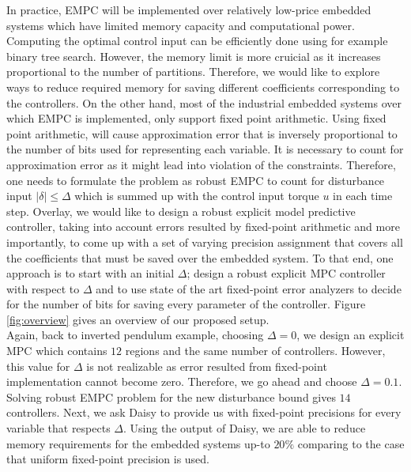 	In practice, EMPC will be implemented over relatively low-price embedded systems which have limited memory capacity and computational power. Computing the optimal control input can be efficiently done using for example binary tree search. However, the memory limit is more cruicial as it increases proportional to the number of partitions.	Therefore, we would like to explore ways to reduce required memory for saving different coefficients corresponding to the controllers.
	On the other hand, most of the industrial embedded systems over which EMPC is implemented, only support fixed point arithmetic. Using fixed point arithmetic, will cause approximation error that is inversely proportional to the number of bits used for representing each variable. It is necessary to count for approximation error as it might lead into violation of the constraints. Therefore, one needs to formulate the problem as robust EMPC to count for disturbance input $|\delta|\leq \Delta$ which is summed up with the control input torque $u$ in each time step. %
	Overlay, we would like to design a robust explicit model predictive controller, taking into account errors resulted by fixed-point arithmetic and more importantly, to come up with a set of varying precision assignment that covers all the coefficients that must be saved over the embedded system. To that end, one approach is to start with an initial $\Delta$; design a robust explicit MPC controller with respect to $\Delta$ and to use state of the art fixed-point error analyzers to decide for the number of bits for saving every parameter of the controller. Figure \ref{fig:overview} gives an overview of our proposed setup.\\
	Again, back to inverted pendulum example, choosing $\Delta=0$, we design an explicit MPC which contains $12$ regions and the same number of controllers. However, this value for $\Delta$ is not realizable as error resulted from fixed-point implementation cannot become zero. Therefore, we go ahead and choose $\Delta=0.1$. Solving robust EMPC problem for the new disturbance bound gives $14$ controllers. Next, we ask Daisy to provide us with fixed-point precisions for every variable that respects $\Delta$. Using the output of Daisy, we are able to reduce memory requirements for the embedded systems up-to $20\%$ comparing to the case that uniform fixed-point precision is used.
	
